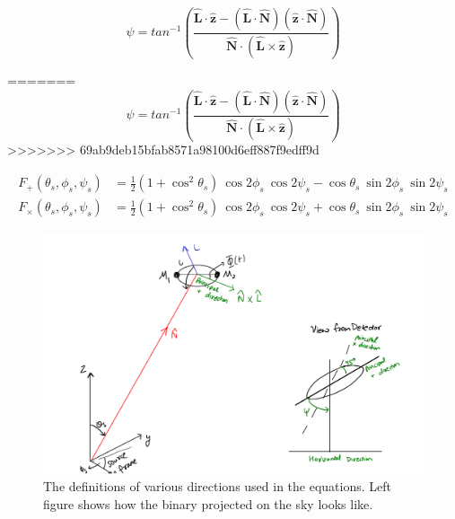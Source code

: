 \documentclass[10pt,a4paper]{article}
\begin{document}
\begin{equation}
\psi = tan^{-1} \left(\frac{\hat{\textbf{L}}\cdot \hat{\textbf{z}} - (\hat{\textbf{L}}\cdot \hat{\textbf{N}})(\hat{\textbf{z}} \cdot \hat{\textbf{N}})}{\hat{\textbf{N}} \cdot (\hat{\textbf{L}} \times \hat{\textbf{z}})}\right)
\end{equation}

=======
\begin{equation}
\psi = tan^{-1} \left(\frac{\hat{\textbf{L}}\cdot \hat{\textbf{z}} - (\hat{\textbf{L}}\cdot \hat{\textbf{N}})(\hat{\textbf{z}} \cdot \hat{\textbf{N}})}{\hat{\textbf{N}} \cdot (\hat{\textbf{L}} \times \hat{\textbf{z}})}\right)
\end{equation}
>>>>>>> 69ab9deb15bfab8571a98100d6eff887f9edff9d

\begin{align}
F_{+}(\theta_s,\phi_s,\psi_s)&=\frac{1}{2}(1+ \cos^2\theta_s) \ \cos2\phi_s \ \cos2\psi_s - \cos\theta_s \ \sin 2\phi_s \ \sin 2\psi_s\\
F_{\times}(\theta_s,\phi_s,\psi_s)&=\frac{1}{2}(1+ \cos^2\theta_s) \ \cos2\phi_s \ \cos2\psi_s + \cos\theta_s \ \sin 2\phi_s \ \sin 2\psi_s
\end{align}


\begin{figure}[!h]
\centering
\includegraphics[scale=0.6]{../Figures/directions.pdf}
\caption{The definitions of various directions used in the equations. Left figure shows how the binary projected on the sky looks like.\label{fig:directions}}
\end{figure}
\end{document}
